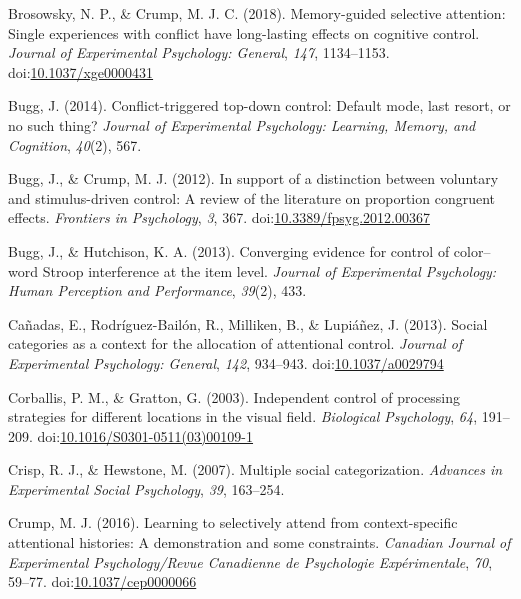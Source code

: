 \documentclass[english,,man,floatsintext]{apa6}
\begin{document}
\leavevmode\hypertarget{ref-brosowsky_memory-guided_2018}{}%
Brosowsky, N. P., \& Crump, M. J. C. (2018). Memory-guided selective attention: Single experiences with conflict have long-lasting effects on cognitive control. \emph{Journal of Experimental Psychology: General}, \emph{147}, 1134--1153. doi:\href{https://doi.org/10.1037/xge0000431}{10.1037/xge0000431}

\leavevmode\hypertarget{ref-bugg_conflict-triggered_2014}{}%
Bugg, J. (2014). Conflict-triggered top-down control: Default mode, last resort, or no such thing? \emph{Journal of Experimental Psychology: Learning, Memory, and Cognition}, \emph{40}(2), 567.

\leavevmode\hypertarget{ref-bugg_support_2012}{}%
Bugg, J., \& Crump, M. J. (2012). In support of a distinction between voluntary and stimulus-driven control: A review of the literature on proportion congruent effects. \emph{Frontiers in Psychology}, \emph{3}, 367. doi:\href{https://doi.org/10.3389/fpsyg.2012.00367}{10.3389/fpsyg.2012.00367}

\leavevmode\hypertarget{ref-bugg_converging_2013}{}%
Bugg, J., \& Hutchison, K. A. (2013). Converging evidence for control of color--word Stroop interference at the item level. \emph{Journal of Experimental Psychology: Human Perception and Performance}, \emph{39}(2), 433.

\leavevmode\hypertarget{ref-canadas_social_2013}{}%
Cañadas, E., Rodríguez-Bailón, R., Milliken, B., \& Lupiáñez, J. (2013). Social categories as a context for the allocation of attentional control. \emph{Journal of Experimental Psychology: General}, \emph{142}, 934--943. doi:\href{https://doi.org/10.1037/a0029794}{10.1037/a0029794}

\leavevmode\hypertarget{ref-corballis_independent_2003}{}%
Corballis, P. M., \& Gratton, G. (2003). Independent control of processing strategies for different locations in the visual field. \emph{Biological Psychology}, \emph{64}, 191--209. doi:\href{https://doi.org/10.1016/S0301-0511(03)00109-1}{10.1016/S0301-0511(03)00109-1}

\leavevmode\hypertarget{ref-crisp_multiple_2007}{}%
Crisp, R. J., \& Hewstone, M. (2007). Multiple social categorization. \emph{Advances in Experimental Social Psychology}, \emph{39}, 163--254.

\leavevmode\hypertarget{ref-crump_learning_2016}{}%
Crump, M. J. (2016). Learning to selectively attend from context-specific attentional histories: A demonstration and some constraints. \emph{Canadian Journal of Experimental Psychology/Revue Canadienne de Psychologie Expérimentale}, \emph{70}, 59--77. doi:\href{https://doi.org/10.1037/cep0000066}{10.1037/cep0000066}
\end{document}
